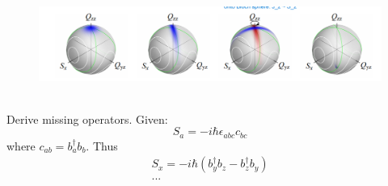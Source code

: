 \begin{figure}
	\centering
	\includegraphics[width=0.7\linewidth]{chapman_fig1}
	\caption{}
	\label{fig:chapmanfig1}
\end{figure}
\\ 
Derive missing operators. Given:
\begin{equation}
	S_a = - i \hbar \epsilon_{abc} c_{bc}
\end{equation}
where $c_{ab} = b^\dag_a b_b$. Thus 
\begin{align}
	S_x = - i \hbar ( b_y^\dag b_z - b_z^\dag b_y)
	\\
	...
\end{align}











 


